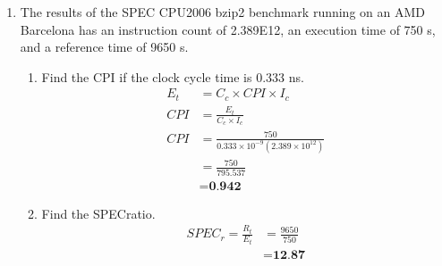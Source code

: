 \documentclass[10pt]{article}
\begin{document}
\begin{enumerate}
    \item The results of the SPEC CPU2006 bzip2 benchmark running on an AMD Barcelona has an instruction count of 2.389E12, an execution time of 750 s, and a reference time of 9650 s.
    \begin{enumerate}
        \item
        Find the CPI if the clock cycle time is 0.333 ns.
        \begin{align*}
            E_t &= C_c \times CPI \times I_c\\
            CPI &= \frac{E_t}{C_c \times I_c}\\
            CPI &= \frac{750}{0.333 \times 10^{-9} (2.389 \times 10^{12})}\\
            &= \frac{750}{795.537}\\
            &= \textbf{0.942}
        \end{align*}
        
        \item
        Find the SPECratio.
        \begin{align*}
            SPEC_r = \frac{R_t}{E_t} &= \frac{9650}{750}\\
            &= \textbf{12.87}
        \end{align*}
        

\end{enumerate}
\end{enumerate}
\end{document}
